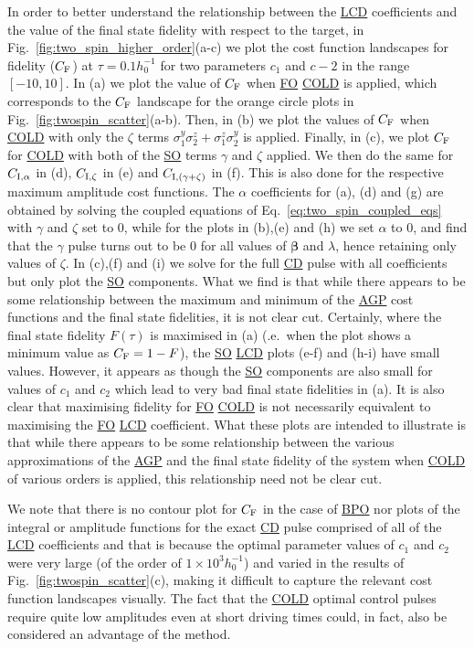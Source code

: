 \documentclass[a4paper,oneside,11pt]{book}
\newcommand{\betabb}{\boldsymbol{\beta}}
\newcommand{\sy}{\sigma^y}
\newcommand{\sz}{\sigma^z}
\newcommand{\acrref}[1]{\hyperref[acr:#1]{#1}}
\providecommand{\DIFaddtex}[1]{{\protect\color{blue}\uwave{#1}}} %
\providecommand{\DIFdeltex}[1]{{\protect\color{red}\sout{#1}}}                      %
\providecommand{\DIFaddbegin}{} %
\providecommand{\DIFaddend}{} %
\providecommand{\DIFdelbegin}{} %
\providecommand{\DIFdelend}{} %
\providecommand{\DIFadd}[1]{\texorpdfstring{\DIFaddtex{#1}}{#1}} %
\providecommand{\DIFdel}[1]{\texorpdfstring{\DIFdeltex{#1}}{}} %
\newcommand{\DIFscaledelfig}{0.5}
\newlength{\DIFdelgraphicswidth} %
\newlength{\DIFdelgraphicsheight} %
\newcommand{\DIFaddincludegraphics}[2][]{{\color{blue}\fbox{\DIFOincludegraphics[#1]{#2}}}} %
\newcommand{\DIFdelincludegraphics}[2][]{%
\sbox{\DIFdelgraphicsbox}{\DIFOincludegraphics[#1]{#2}}%
\settoboxwidth{\DIFdelgraphicswidth}{\DIFdelgraphicsbox} %
\settoboxtotalheight{\DIFdelgraphicsheight}{\DIFdelgraphicsbox} %
\scalebox{\DIFscaledelfig}{%
\parbox[b]{\DIFdelgraphicswidth}{\usebox{\DIFdelgraphicsbox}\\[-\baselineskip] \rule{\DIFdelgraphicswidth}{0em}}\llap{\resizebox{\DIFdelgraphicswidth}{\DIFdelgraphicsheight}{%
\setlength{\unitlength}{\DIFdelgraphicswidth}%
\begin{picture}(1,1)%
\thicklines\linethickness{2pt} %
{\color[rgb]{1,0,0}\put(0,0){\framebox(1,1){}}}%
{\color[rgb]{1,0,0}\put(0,0){\line( 1,1){1}}}%
{\color[rgb]{1,0,0}\put(0,1){\line(1,-1){1}}}%
\end{picture}%
}\hspace*{3pt}}} %
} %
\DeclareRobustCommand{\DIFaddbegin}{\DIFOaddbegin \let\includegraphics\DIFaddincludegraphics} %
\DeclareRobustCommand{\DIFaddend}{\DIFOaddend \let\includegraphics\DIFOincludegraphics} %
\DeclareRobustCommand{\DIFdelbegin}{\DIFOdelbegin \let\includegraphics\DIFdelincludegraphics} %
\DeclareRobustCommand{\DIFdelend}{\DIFOaddend \let\includegraphics\DIFOincludegraphics} %
\begin{document}
In order to better understand the relationship between the \acrref{LCD} coefficients and the value of the final state fidelity with respect to the target, in Fig.~\ref{fig:two_spin_higher_order}(a-c) we plot the cost function landscapes for fidelity ($C_{\rm F}$) at $\tau = 0.1h_0^{-1}$ for two parameters $c_1$ and \DIFdelbegin \DIFdel{$c-2$ }\DIFdelend \DIFaddbegin \DIFadd{$c_2$ }\DIFaddend in the range $[-10, 10]$. In (a) we plot the value of $C_{\rm F}$ when \acrref{FO} \acrref{COLD} is applied, which corresponds to the $C_{\rm F}$ landscape for the orange circle plots in Fig.~\ref{fig:twospin_scatter}(a-b). Then, in (b) we plot the values of $C_{\rm F}$ when \acrref{COLD} with only the $\zeta$ terms $\sy_1\sz_2 + \sz_1\sy_2$ is applied. Finally, in (c), we plot $C_{\rm F}$ for  \acrref{COLD} with both of the \acrref{SO} terms $\gamma$ and $\zeta$ applied.  We then do the same for $C_{\rm I, \alpha}$ in (d), $C_{\rm I,\zeta}$ in (e) and $C_{\rm I,(\gamma + \zeta)}$ in (f). This is also done for the respective maximum amplitude cost functions. The $\alpha$ coefficients for (a), (d) and (g) are obtained by solving the coupled equations of Eq.~\eqref{eq:two_spin_coupled_eqs} with $\gamma$ and $\zeta$ set to $0$, while for the plots in (b),(e) and (h) we set $\alpha$ to $0$, and find that the $\gamma$ pulse turns out to be $0$ for all values of $\betabb$ and $\lambda$, hence retaining only values of $\zeta$. In (c),(f) and (i) we solve for the full \acrref{CD} pulse with all coefficients but only plot the \acrref{SO} components. What we find is that while there appears to be some relationship between the maximum and minimum of the \acrref{AGP} cost functions and the final state fidelities, it is not clear cut. Certainly, where the final state fidelity $F(\tau)$ is maximised in (a) (\@i.e.~when the plot shows a minimum value as $C_{\rm F} = 1 - F$), the \acrref{SO} \acrref{LCD} plots (e-f) and (h-i) have small values. However, it appears as though the \acrref{SO} components are also small for values of $c_1$ and $c_2$ which lead to very bad final state fidelities in (a). It is also clear that maximising fidelity for \acrref{FO} \acrref{COLD} is not necessarily equivalent to maximising the \acrref{FO} \acrref{LCD} coefficient. What these plots are intended to illustrate is that while there appears to be some relationship between the various approximations of the \acrref{AGP} and the final state fidelity of the system when \acrref{COLD} of various orders is applied, this relationship need not be clear cut.

We note that there is no contour plot for $C_{\rm F}$ in the case of \acrref{BPO} nor plots of the integral or amplitude functions for the exact \acrref{CD} pulse comprised of all of the \acrref{LCD} coefficients and that is because the optimal parameter values of $c_1$ and $c_2$ were very large (of the order of $1\times10^3 h_0^{-1}$) and varied in the results of Fig.~\ref{fig:twospin_scatter}(c), making it difficult to capture the relevant cost function landscapes visually. The fact that the \acrref{COLD} optimal control pulses require quite low amplitudes even at short driving times could, in fact, also be considered an advantage of the method.
\end{document}
